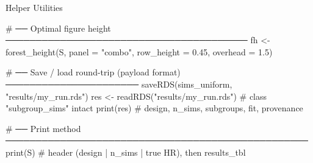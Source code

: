 \documentclass[
  11pt,
  ignorenonframetext,
  aspectratio=169,
]{beamer}
\newenvironment{Shaded}{\begin{snugshade}}{\end{snugshade}}
\newcommand{\AttributeTok}[1]{\textcolor[rgb]{0.40,0.45,0.13}{#1}}
\newcommand{\CommentTok}[1]{\textcolor[rgb]{0.37,0.37,0.37}{#1}}
\newcommand{\FloatTok}[1]{\textcolor[rgb]{0.68,0.00,0.00}{#1}}
\newcommand{\FunctionTok}[1]{\textcolor[rgb]{0.28,0.35,0.67}{#1}}
\newcommand{\NormalTok}[1]{\textcolor[rgb]{0.00,0.23,0.31}{#1}}
\newcommand{\OtherTok}[1]{\textcolor[rgb]{0.00,0.23,0.31}{#1}}
\newcommand{\StringTok}[1]{\textcolor[rgb]{0.13,0.47,0.30}{#1}}
\begin{document}
\begin{frame}[fragile]{Helper Utilities}
\protect{}\label{helper-utilities}
\footnotesize

\begin{Shaded}
\begin{Highlighting}[]
\CommentTok{\# ── Optimal figure height ────────────────────────────────────────}
\NormalTok{fh }\OtherTok{\textless{}{-}} \FunctionTok{forest\_height}\NormalTok{(S, }\AttributeTok{panel =} \StringTok{"combo"}\NormalTok{,}
                    \AttributeTok{row\_height =} \FloatTok{0.45}\NormalTok{, }\AttributeTok{overhead =} \FloatTok{1.5}\NormalTok{)}

\CommentTok{\# ── Save / load round{-}trip (payload format) ──────────────────────}
\FunctionTok{saveRDS}\NormalTok{(sims\_uniform, }\StringTok{"results/my\_run.rds"}\NormalTok{)}
\NormalTok{res }\OtherTok{\textless{}{-}} \FunctionTok{readRDS}\NormalTok{(}\StringTok{"results/my\_run.rds"}\NormalTok{)   }\CommentTok{\# class "subgroup\_sims" intact}
\FunctionTok{print}\NormalTok{(res)  }\CommentTok{\# design, n\_sims, subgroups, fit, provenance}

\CommentTok{\# ── Print method ──────────────────────────────────────────────────}
\FunctionTok{print}\NormalTok{(S)   }\CommentTok{\# header (design | n\_sims | true HR), then results\_tbl}
\end{Highlighting}
\end{Shaded}
\end{frame}
\end{document}
